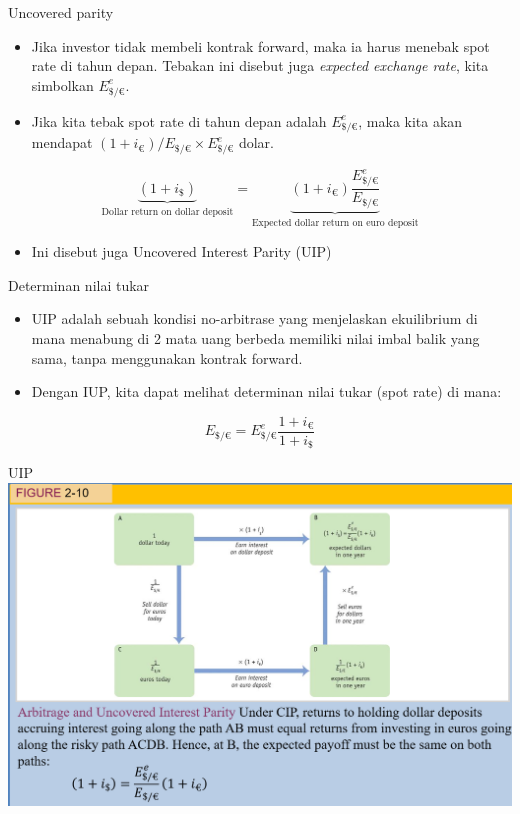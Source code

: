 \documentclass[
  ignorenonframetext,
]{beamer}
\providecommand{\tightlist}{%
  \setlength{\itemsep}{0pt}\setlength{\parskip}{0pt}}\usepackage{longtable,booktabs,array}
\begin{document}
\begin{frame}{Uncovered parity}
\label{uncovered-parity}
\begin{itemize}
\item
  Jika investor tidak membeli kontrak forward, maka ia harus menebak
  spot rate di tahun depan. Tebakan ini disebut juga \emph{expected
  exchange rate}, kita simbolkan \(E_{\$/€}^e\).
\item
  Jika kita tebak spot rate di tahun depan adalah \(E_{\$/€}^e\), maka
  kita akan mendapat \((1+i_{€})/E_{\$/€} \times E_{\$/€}^e\) dolar.
\end{itemize}

\[
\underbrace{(1+i_{\$})}_\text{Dollar return on dollar deposit}=\underbrace{(1+i_{€})\frac{E_{\$/€}^e}{E_{\$/€}}}_\text{Expected dollar return on euro deposit}
\]

\begin{itemize}
\tightlist
\item
  Ini disebut juga Uncovered Interest Parity (UIP)
\end{itemize}
\end{frame}

\begin{frame}{Determinan nilai tukar}
\label{determinan-nilai-tukar}
\begin{itemize}
\item
  UIP adalah sebuah kondisi no-arbitrase yang menjelaskan ekuilibrium di
  mana menabung di 2 mata uang berbeda memiliki nilai imbal balik yang
  sama, tanpa menggunakan kontrak forward.
\item
  Dengan IUP, kita dapat melihat determinan nilai tukar (spot rate) di
  mana:
\end{itemize}

\[
E_{\$/€}=E_{\$/€}^e \frac{1+i_{€}}{1+i_{\$}}
\]
\end{frame}

\begin{frame}{UIP}
\label{uip}
\includegraphics{pic3.png}
\end{frame}
\end{document}

